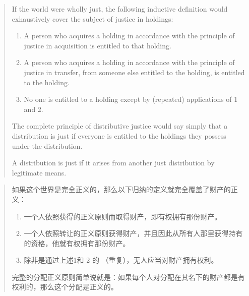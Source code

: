 \begin{paracol}{2}
\begin{quotation}
	If the world were wholly just, the following inductive definition
	would exhaustively cover the subject of justice in holdings:
	\begin{enumerate}
		\item A person who acquires a holding in accordance with the
		principle of justice in acquisition is entitled to that holding.
		\item A person who acquires a holding in accordance with the
		principle of justice in transfer, from someone else entitled to
		the holding, is entitled to the holding.
		\item No one is entitled to a holding except by (repeated) applications of 1 and 2. 
	\end{enumerate}
	The complete principle of distributive justice would say simply that a distribution is just if everyone is entitled to the holdings they possess under the distribution.
	
	
	A distribution is just if it arises from another just distribution
	by legitimate means.
\end{quotation}
\switchcolumn
\begin{quotation}
	如果这个世界是完全正义的，那么以下归纳的定义就完全覆盖了财产的正义：
	\begin{enumerate}
		\item 一个人依照获得的正义原则而取得财产，即有权拥有那份财产。
		\item 一个人依照转让的正义原则获得财产，并且因此从所有人那里获得持有的资格，他就有权拥有那份财产。
		\item 除非是通过上述1和 2 的 （重复），无人应当对财产拥有权利。
	\end{enumerate}
	完整的分配正义原则简单说就是：如果每个人对分配在其名下的财产都是有权利的，那么这个分配是正义的。
	

\end{quotation}
\end{paracol}
